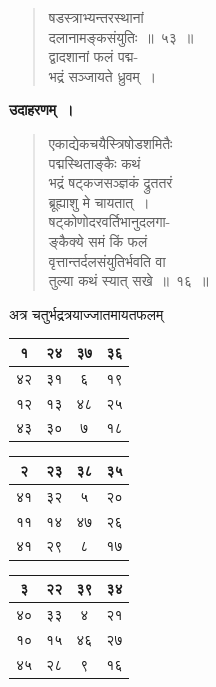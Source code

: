 \documentclass[11pt, openany]{book}
\begin{document}
\newpage

\begin{quote}
{\gk षडस्त्राभ्यन्तरस्थानां\\
दलानामङ्कसंयुतिः~॥~५३~॥\\
द्वादशानां फलं पद्म-\\
भद्रं सञ्जायते ध्रुवम्~।}
\end{quote}

\textbf{उदाहरणम्~।}

\begin{quote}
{\ex एकाद्येकचयैस्त्रिषोडशमितैः\\
	पद्मस्थिताङ्कैः कथं\\
	भद्रं षट्कजसञ्ज्ञकं द्रुततरं\\
	ब्रूह्याशु मे चायतात्~।\\
	षट्कोणोदरवर्तिभानुदलगा-\\
	ङ्कैक्ये समं किं फलं\\
	वृत्तान्तर्दलसंयुतिर्भवति वा\\
	तुल्या कथं स्यात् सखे~॥~१६~॥}
\end{quote}

अत्र चतुर्भद्रत्रयाज्जातमायतफलम्\textendash

\begin{table}[h]
\setlength{\extrarowheight}{2pt} \setlength{\tabcolsep}{2pt}	
\centering
\hspace{6mm} \begin{tabular}{|c|c|c|c|}
\hline
१ & २४ & ३७ & ३६\\
\hline
४२ & ३१ & ६ & १९\\
\hline
१२ & १३ & ४८ &  २५\\
\hline
४३ & ३० & ७ & १८\\
\hline
\end{tabular} \hspace{2mm} 
\begin{tabular}{|c|c|c|c|}
\hline
२ & २३ & ३८ & ३५\\
\hline
४१ & ३२ & ५ & २०\\
\hline
११ & १४ & ४७ &  २६\\
\hline
४१ & २९ & ८ & १७\\
\hline
\end{tabular} \hspace{2mm}
\begin{tabular}{|c|c|c|c|}
	\hline
	३ & २२ & ३९ & ३४\\
	\hline
	४० & ३३ & ४ & २१\\
	\hline
	१० & १५ & ४६ &  २७\\
	\hline
	४५ & २८ & ९ & १६\\
	\hline
\end{tabular}

\end{table}
\end{document}

